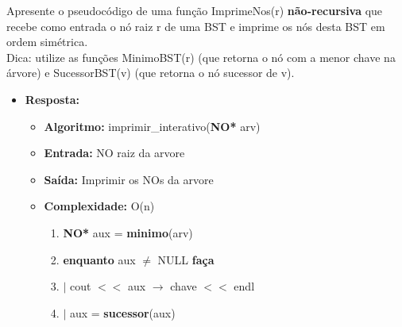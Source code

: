 Apresente o pseudocódigo de uma função ImprimeNos(r) \textbf{não-recursiva} que recebe como
entrada o nó raiz r de uma BST e imprime os nós desta BST em ordem simétrica. \\
Dica: utilize as funções MinimoBST(r) (que retorna o nó com a menor chave na árvore) e
SucessorBST(v) (que retorna o nó sucessor de v).

\begin{itemize}
	\item \textbf{Resposta:}
	
	\begin{itemize}
		\item \textbf{Algoritmo:} imprimir\_interativo(\textbf{NO*} arv)
		\item \textbf{Entrada:} NO raiz da arvore
		\item \textbf{Saída:}
		Imprimir os NOs da arvore
		\item \textbf{Complexidade:} O(n)
		
		\begin{enumerate}[1--]
		
		\item \textbf{NO*} aux = \textbf{minimo}(arv)
		\item \textbf{enquanto} aux $\neq$ NULL \textbf{faça}
		\item $|$ \quad
		cout $<<$ aux $\rightarrow$ chave $<<$ endl
		\item $|$ \quad
		aux = \textbf{sucessor}(aux)
		
		\end{enumerate}
	\end{itemize}
\end{itemize}